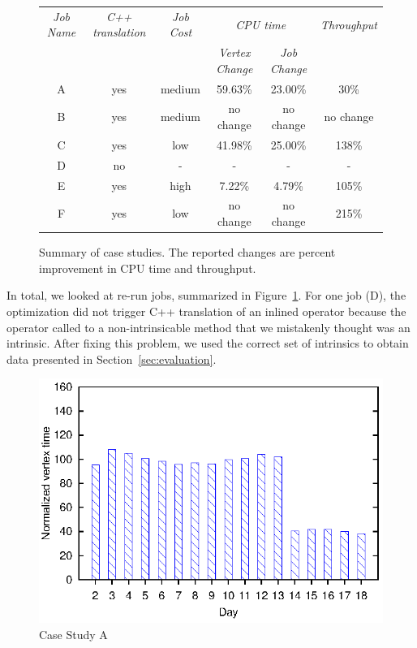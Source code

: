 \begin{figure}[ht]
\begin{tabular}{c|c|c|c|c|c} 
\toprule
  {\em Job Name} & {\em C++ translation}&{\em Job Cost} & \multicolumn{2}{c}{\em CPU time} &  {\em Throughput } \\
  \cmidrule{4-5}  
  & & & {\em Vertex Change} & {\em Job Change} &  \\
  \midrule

A & yes & medium & 59.63\%  & 23.00\% & 30\% \\
B &yes & medium & no change & no change & no change\\
C & yes & low    & 41.98\%  & 25.00\% & 138\% \\
D & no & - & - & - & -\\
E & yes & high   & 7.22\%   & 4.79\% &  105\% \\
F & yes & low & no change & no change & 215\% \\

\end{tabular}
\caption{Summary of case studies. The reported changes are percent improvement in CPU time and throughput. \label{fig:caseStudySummary}}
\end{figure}

In total, we looked at \casestudyjobs{} re-run jobs, summarized in Figure~\ref{fig:caseStudySummary}. 
For one job (D), the optimization did not trigger C++ translation of an inlined operator because the operator called to a non-intrinsicable method that we mistakenly thought was an intrinsic.
After fixing this problem, we used the correct set of intrinsics to obtain data presented in Section~\ref{sec:evaluation}.
\begin{figure}[ht]
\includegraphics{graphs/normalizedTimesA}
\caption{Case Study A \label{fig:CaseStudyA}}
\end{figure}

